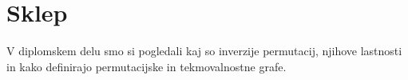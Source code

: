 \documentclass[a4paper, 12pt]{book}
\begin{document}




\chapter{Sklep}

V diplomskem delu smo si pogledali kaj so inverzije permutacij, njihove lastnosti in kako definirajo permutacijske in tekmovalnostne grafe.
\end{document}
